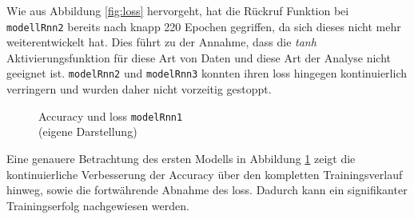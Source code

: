 \documentclass[
    12pt, %
    DIV10,
    ngerman, %
    a4paper, %
    oneside, %
    titlepage, %
    parskip=half, %
    headings=normal, %
    listof=totoc, %
    bibliography=totoc, %
    index=totoc, %
    captions=tableheading, %
    final %
]{scrreprt}
\begin{document}
Wie aus Abbildung \ref{fig:loss} hervorgeht, hat die Rückruf Funktion bei \texttt{modellRnn2} bereits nach knapp 220 Epochen gegriffen, da sich dieses nicht mehr weiterentwickelt hat. Dies führt zu der Annahme, dass die \emph{tanh} Aktivierungsfunktion für diese Art von Daten und diese Art der Analyse nicht geeignet ist. \texttt{modelRnn2} und \texttt{modelRnn3} konnten ihren loss hingegen kontinuierlich verringern und wurden daher nicht vorzeitig gestoppt.

\begin{figure}[H]
\caption{Accuracy und loss \texttt{modelRnn1}\\(eigene Darstellung)}\label{fig:rnn1}
\end{figure}
Eine genauere Betrachtung des ersten Modells in Abbildung \ref{fig:rnn1} zeigt die kontinuierliche Verbesserung der Accuracy über den kompletten Trainingsverlauf hinweg, sowie die fortwährende Abnahme des loss. Dadurch kann ein signifikanter Trainingserfolg nachgewiesen werden.
\end{document}
